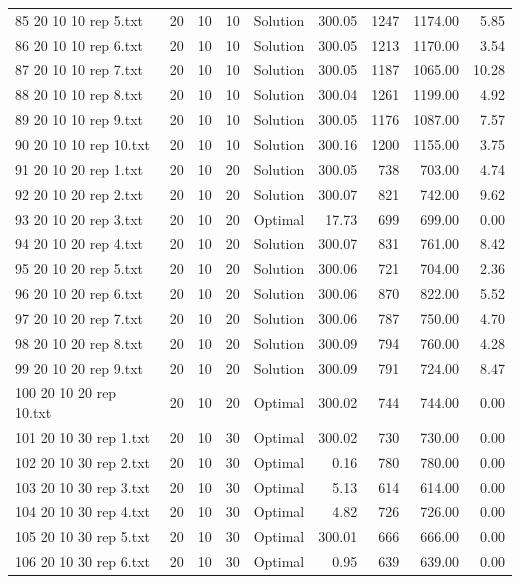 \begin{longtable}{lrrllrrrr}
85 20 10 10 rep 5.txt & 20 & 10 & 10 & Solution & 300.05 & 1247 & 1174.00 &  5.85\\
86 20 10 10 rep 6.txt & 20 & 10 & 10 & Solution & 300.05 & 1213 & 1170.00 &  3.54\\
87 20 10 10 rep 7.txt & 20 & 10 & 10 & Solution & 300.05 & 1187 & 1065.00 & 10.28\\
88 20 10 10 rep 8.txt & 20 & 10 & 10 & Solution & 300.04 & 1261 & 1199.00 &  4.92\\
89 20 10 10 rep 9.txt & 20 & 10 & 10 & Solution & 300.05 & 1176 & 1087.00 &  7.57\\
90 20 10 10 rep 10.txt & 20 & 10 & 10 & Solution & 300.16 & 1200 & 1155.00 &  3.75\\
91 20 10 20 rep 1.txt & 20 & 10 & 20 & Solution & 300.05 & 738 & 703.00 &  4.74\\
92 20 10 20 rep 2.txt & 20 & 10 & 20 & Solution & 300.07 & 821 & 742.00 &  9.62\\
93 20 10 20 rep 3.txt & 20 & 10 & 20 & Optimal & 17.73 & 699 & 699.00 &  0.00\\
94 20 10 20 rep 4.txt & 20 & 10 & 20 & Solution & 300.07 & 831 & 761.00 &  8.42\\
95 20 10 20 rep 5.txt & 20 & 10 & 20 & Solution & 300.06 & 721 & 704.00 &  2.36\\
96 20 10 20 rep 6.txt & 20 & 10 & 20 & Solution & 300.06 & 870 & 822.00 &  5.52\\
97 20 10 20 rep 7.txt & 20 & 10 & 20 & Solution & 300.06 & 787 & 750.00 &  4.70\\
98 20 10 20 rep 8.txt & 20 & 10 & 20 & Solution & 300.09 & 794 & 760.00 &  4.28\\
99 20 10 20 rep 9.txt & 20 & 10 & 20 & Solution & 300.09 & 791 & 724.00 &  8.47\\
100 20 10 20 rep 10.txt & 20 & 10 & 20 & Optimal & 300.02 & 744 & 744.00 &  0.00\\
101 20 10 30 rep 1.txt & 20 & 10 & 30 & Optimal & 300.02 & 730 & 730.00 &  0.00\\
102 20 10 30 rep 2.txt & 20 & 10 & 30 & Optimal &  0.16 & 780 & 780.00 &  0.00\\
103 20 10 30 rep 3.txt & 20 & 10 & 30 & Optimal &  5.13 & 614 & 614.00 &  0.00\\
104 20 10 30 rep 4.txt & 20 & 10 & 30 & Optimal &  4.82 & 726 & 726.00 &  0.00\\
105 20 10 30 rep 5.txt & 20 & 10 & 30 & Optimal & 300.01 & 666 & 666.00 &  0.00\\
106 20 10 30 rep 6.txt & 20 & 10 & 30 & Optimal &  0.95 & 639 & 639.00 &  0.00\\

\end{longtable}
